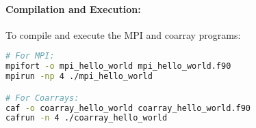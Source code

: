 \paragraph{Compilation and Execution:}

To compile and execute the MPI and coarray programs:
\begin{lstlisting}[language=bash]
# For MPI:
mpifort -o mpi_hello_world mpi_hello_world.f90
mpirun -np 4 ./mpi_hello_world

# For Coarrays:
caf -o coarray_hello_world coarray_hello_world.f90
cafrun -n 4 ./coarray_hello_world
\end{lstlisting}

\endinput  %

